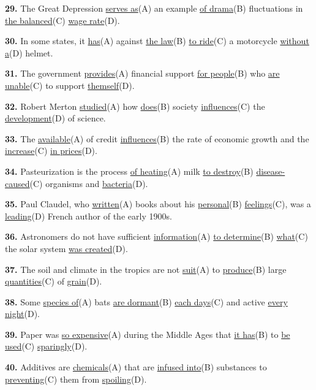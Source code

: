 \documentclass[12pt]{article}
\begin{document}
\par
\vspace{\questionblockgap}
\noindent\textbf{29.} The Great Depression \uline{serves as}(A) an example \uline{of drama}(B) fluctuations in \uline{the balanced}(C) \uline{wage rate}(D).
\par
\vspace{\questionblockgap}
\noindent\textbf{30.} In some states, it \uline{has}(A) against \uline{the law}(B) \uline{to ride}(C) a motorcycle \uline{without a}(D) helmet.
\par
\vspace{\questionblockgap}
\noindent\textbf{31.} The government \uline{provides}(A) financial support \uline{for people}(B) who \uline{are unable}(C) to support \uline{themself}(D).
\par
\vspace{\questionblockgap}
\noindent\textbf{32.} Robert Merton \uline{studied}(A) how \uline{does}(B) society \uline{influences}(C) the \uline{development}(D) of science.
\par
\vspace{\questionblockgap}
\noindent\textbf{33.} The \uline{available}(A) of credit \uline{influences}(B) the rate of economic growth and the \uline{increase}(C) \uline{in prices}(D).
\par
\vspace{\questionblockgap}
\noindent\textbf{34.} Pasteurization is the process \uline{of heating}(A) milk \uline{to destroy}(B) \uline{disease-caused}(C) organisms and \uline{bacteria}(D).
\par
\vspace{\questionblockgap}
\noindent\textbf{35.} Paul Claudel, who \uline{written}(A) books about his \uline{personal}(B) \uline{feelings}(C), was a \uline{leading}(D) French author of the early 1900s.
\par
\vspace{\questionblockgap}
\noindent\textbf{36.} Astronomers do not have sufficient \uline{information}(A) \uline{to determine}(B) \uline{what}(C) the solar system \uline{was created}(D).
\par
\vspace{\questionblockgap}
\noindent\textbf{37.} The soil and climate in the tropics are not \uline{suit}(A) to \uline{produce}(B) large \uline{quantities}(C) of \uline{grain}(D).
\par
\vspace{\questionblockgap}
\noindent\textbf{38.} Some \uline{species of}(A) bats \uline{are dormant}(B) \uline{each days}(C) and active \uline{every night}(D).
\par
\vspace{\questionblockgap}
\noindent\textbf{39.} Paper was \uline{so expensive}(A) during the Middle Ages that \uline{it has}(B) to \uline{be used}(C) \uline{sparingly}(D).
\par
\vspace{\questionblockgap}
\noindent\textbf{40.} Additives are \uline{chemicals}(A) that are \uline{infused into}(B) substances to \uline{preventing}(C) them from \uline{spoiling}(D).
\par
\vspace{\questionblockgap}
\end{document}
